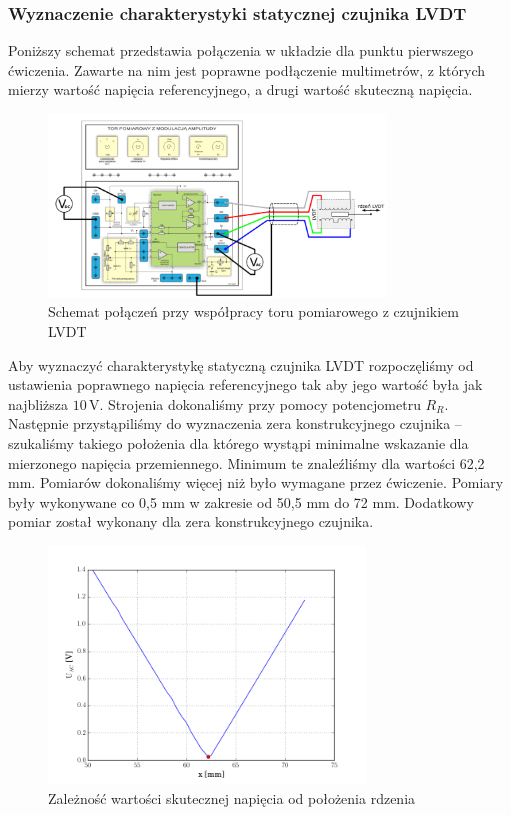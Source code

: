 \documentclass[a4paper, 12pt, titlepage]{article}
\begin{document}
			\subsubsection{Wyznaczenie charakterystyki statycznej czujnika LVDT}
				Poniższy schemat przedstawia połączenia w układzie dla punktu pierwszego ćwiczenia. Zawarte na nim jest poprawne podłączenie multimetrów, z których mierzy wartość napięcia referencyjnego, a drugi wartość skuteczną napięcia. %
				\begin{figure}[H]
					\centering
					\includegraphics[width=0.8\textwidth]{./img/tor_pierwsze.png}
					\caption{\small{Schemat połączeń przy współpracy toru pomiarowego z czujnikiem LVDT}}
				\end{figure} \noindent
				Aby wyznaczyć charakterystykę statyczną czujnika LVDT rozpoczęliśmy od ustawienia poprawnego napięcia referencyjnego tak aby jego wartość była jak najbliższa $10\,\mathrm{V}$. Strojenia dokonaliśmy przy pomocy potencjometru ${R_R}$.
				\newline \newline
				Następnie przystąpiliśmy do wyznaczenia zera konstrukcyjnego czujnika -- szukaliśmy takiego położenia dla którego wystąpi minimalne wskazanie dla mierzonego napięcia przemiennego. Minimum te znaleźliśmy dla wartości 62,2 mm.
				\newline \newline
				Pomiarów dokonaliśmy więcej niż było wymagane przez ćwiczenie. Pomiary były wykonywane co 0,5 mm w zakresie od 50,5 mm do 72 mm. Dodatkowy pomiar został wykonany dla zera konstrukcyjnego czujnika.
				\begin{figure}[H]
					\centering
					\includegraphics[width=0.75\textwidth]{./img/Uac_od_x.png}
					\caption{\small{Zależność wartości skutecznej napięcia od położenia rdzenia}}
				\end{figure} \noindent
\end{document}
